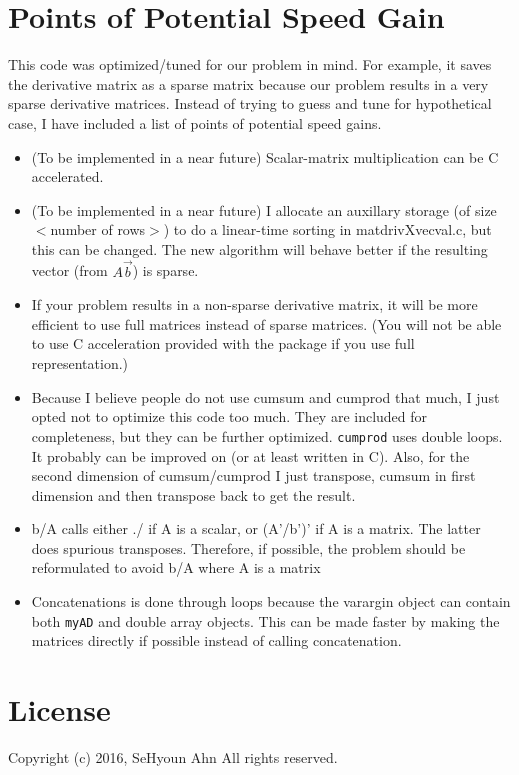 \documentclass{amsart}
\begin{document}
\section{Points of Potential Speed Gain}
This code was optimized/tuned for our problem in mind. For example, it saves the derivative matrix as a sparse matrix because our problem results in a very sparse derivative matrices. Instead of trying to guess and tune for hypothetical case, I have included a list of points of potential speed gains.
\begin{itemize}
\item (To be implemented in a near future) Scalar-matrix multiplication can be C accelerated.
\item (To be implemented in a near future) I allocate an auxillary storage (of size $<$number of rows$>$) to do a linear-time sorting in matdrivXvecval.c, but this can be changed. The new algorithm will behave better if the resulting vector (from $A\vec{b}$) is sparse.
\item If your problem results in a non-sparse derivative matrix, it will be more efficient to use full matrices instead of sparse matrices. (You will not be able to use C acceleration provided with the package if you use full representation.)
\item Because I believe people do not use cumsum and cumprod that much, I just opted not to optimize this code
too much. They are included for completeness, but they can be further optimized. \texttt{cumprod} uses double loops. It probably can be improved on (or at least written in C). Also, for the second dimension of cumsum/cumprod I just transpose, cumsum in first dimension and then transpose back to get the result.
\item b/A calls either ./ if A is a scalar, or (A'/b')' if A is a matrix. The latter does spurious transposes. Therefore, if possible, the problem should be reformulated to avoid b/A where A is a matrix
\item Concatenations is done through loops because the varargin object can contain both \texttt{myAD} and double array objects. This can be made faster by making the matrices directly if possible instead of calling concatenation.
\end{itemize}

\section{License}
Copyright (c) 2016, SeHyoun Ahn
All rights reserved.
\end{document}
